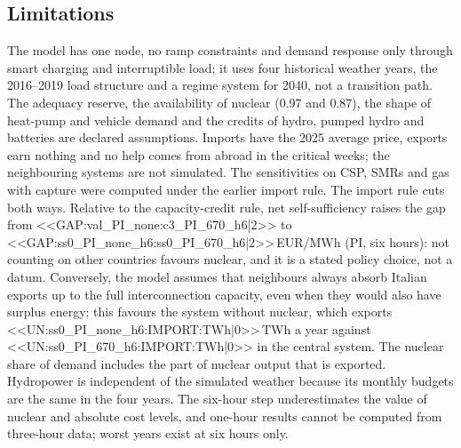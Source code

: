 \subsection{Limitations}\label{sec:limits}
The model has one node, no ramp constraints and demand response only through smart charging and interruptible load; it uses four historical weather years, the 2016--2019 load structure and a regime system for 2040, not a transition path. The adequacy reserve, the availability of nuclear (0.97 and 0.87), the shape of heat-pump and vehicle demand and the credits of hydro, pumped hydro and batteries are declared assumptions. Imports have the 2025 average price, exports earn nothing and no help comes from abroad in the critical weeks; the neighbouring systems are not simulated. The sensitivities on CSP, SMRs and gas with capture were computed under the earlier import rule. The import rule cuts both ways. Relative to the capacity-credit rule, net self-sufficiency raises the gap from <<GAP:val_PI_none:c3_PI_670_h6|2>> to <<GAP:ss0_PI_none_h6:ss0_PI_670_h6|2>>\,EUR/MWh (PI, six hours): not counting on other countries favours nuclear, and it is a stated policy choice, not a datum. Conversely, the model assumes that neighbours always absorb Italian exports up to the full interconnection capacity, even when they would also have surplus energy; this favours the system without nuclear, which exports <<UN:ss0_PI_none_h6:IMPORT:TWh|0>>\,TWh a year against <<UN:ss0_PI_670_h6:IMPORT:TWh|0>> in the central system. The nuclear share of demand includes the part of nuclear output that is exported. Hydropower is independent of the simulated weather because its monthly budgets are the same in the four years. The six-hour step underestimates the value of nuclear and absolute cost levels, and one-hour results cannot be computed from three-hour data; worst years exist at six hours only.

